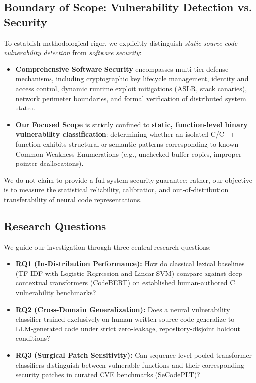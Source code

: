 \documentclass[conference]{IEEEtran}
\begin{document}
\subsection{Boundary of Scope: Vulnerability Detection vs. Security}
To establish methodological rigor, we explicitly distinguish \textit{static source code vulnerability detection} from \textit{software security}:
\begin{itemize}
    \item \textbf{Comprehensive Software Security} encompasses multi-tier defense mechanisms, including cryptographic key lifecycle management, identity and access control, dynamic runtime exploit mitigations (ASLR, stack canaries), network perimeter boundaries, and formal verification of distributed system states.
    \item \textbf{Our Focused Scope} is strictly confined to \textbf{static, function-level binary vulnerability classification}: determining whether an isolated C/C++ function exhibits structural or semantic patterns corresponding to known Common Weakness Enumerations (e.g., unchecked buffer copies, improper pointer deallocations).
\end{itemize}
We do not claim to provide a full-system security guarantee; rather, our objective is to measure the statistical reliability, calibration, and out-of-distribution transferability of neural code representations.

\subsection{Research Questions}
We guide our investigation through three central research questions:
\begin{itemize}
    \item \textbf{RQ1 (In-Distribution Performance):} How do classical lexical baselines (TF-IDF with Logistic Regression and Linear SVM) compare against deep contextual transformers (CodeBERT) on established human-authored C vulnerability benchmarks?
    \item \textbf{RQ2 (Cross-Domain Generalization):} Does a neural vulnerability classifier trained exclusively on human-written source code generalize to LLM-generated code under strict zero-leakage, repository-disjoint holdout conditions?
    \item \textbf{RQ3 (Surgical Patch Sensitivity):} Can sequence-level pooled transformer classifiers distinguish between vulnerable functions and their corresponding security patches in curated CVE benchmarks (SeCodePLT)?
\end{itemize}
\end{document}
